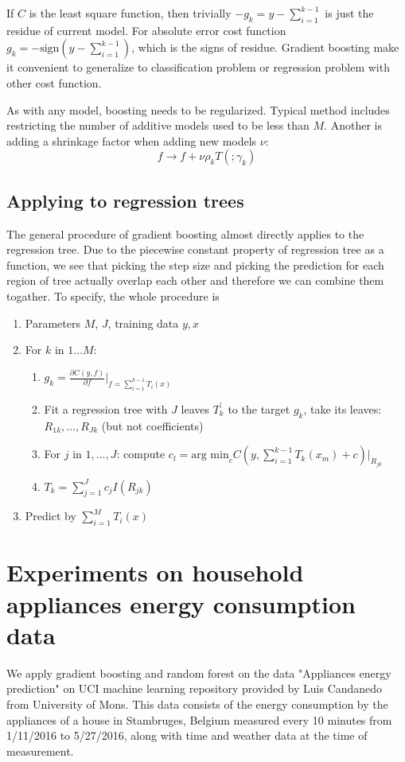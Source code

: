 \documentclass{article}
\begin{document}
If $C$ is the least square function, then trivially $-g_k=y-\sum_{i=1}^{k-1}$ is just the residue of current model. For absolute error cost function $g_k=-\textrm{sign}(y-\sum_{i=1}^{k-1})$, which is the signs of residue. Gradient boosting make it convenient to generalize to classification problem or regression problem with other cost function.

As with any model, boosting needs to be regularized. Typical method includes restricting the number of additive models used to be less than $M$. Another is adding a shrinkage factor when adding new models $\nu$:
\[
f\rightarrow f+\nu\rho_kT( ;\gamma_k)
\]
\subsection{Applying to regression trees}
The general procedure of gradient boosting almost directly applies to the regression tree. Due to the piecewise constant property of regression tree as a function, we see that picking the step size and picking the prediction for each region of tree actually overlap each other and therefore we can combine them togather. To specify, the whole procedure is
\begin{enumerate}
\item
Parameters $M$, $J$, training data $y,x$
\item
For $k$ in $1\dots M$:
\begin{enumerate}
\item
$g_k=\frac{\partial C(y,f)}{\partial f}|_{f=\sum_{i=1}^{k-1}T_i(x)}$
\item
Fit a regression tree with $J$ leaves $T_k^\prime$ to the target $g_k$, take its leaves: $R_{1k},\dots, R_{Jk}$ (but not coefficients)
\item
For $j$ in $1,\dots,J$: compute $c_l=\textrm{arg min}_{c}C(y,\sum_{i=1}^{k-1}T_k(x_m)+c)|_{R_{jk}}$
\item
$T_k=\sum_{j=1}^Jc_jI(R_{jk})$
\end{enumerate}
\item
Predict by $\sum_{i=1}^MT_i(x)$
\end{enumerate}
\section{Experiments on household appliances energy consumption data}
We apply gradient boosting and random forest on the data "Appliances energy prediction" on UCI machine learning repository provided by Luis Candanedo from University of Mons. This data consists of the energy consumption by the appliances of a house in Stambruges, Belgium measured every 10 minutes from 1/11/2016 to 5/27/2016, along with time and weather data at the time of measurement.
\end{document}
